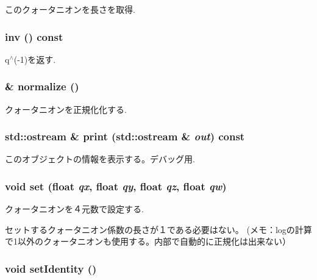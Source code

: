 このクォータニオンを長さを取得. \hypertarget{classm3g_1_1Quaternion_c544c21c80182fc0a7f2c9dbe5f42a0a}{
\subsubsection[{inv}]{ inv () const}}
\label{classm3g_1_1Quaternion_c544c21c80182fc0a7f2c9dbe5f42a0a}


q$^\wedge$(-1)を返す. \hypertarget{classm3g_1_1Quaternion_c9cc178bcc449e08499113c35feb2a2b}{
\subsubsection[{normalize}]{ \& normalize ()}}
\label{classm3g_1_1Quaternion_c9cc178bcc449e08499113c35feb2a2b}


クォータニオンを正規化化する. \hypertarget{classm3g_1_1Quaternion_6fea17fa1532df3794f8cb39cb4f911f}{
\subsubsection[{print}]{\setlength{\rightskip}{0pt plus 5cm}std::ostream \& print (std::ostream \& {\em out}) const}}
\label{classm3g_1_1Quaternion_6fea17fa1532df3794f8cb39cb4f911f}


このオブジェクトの情報を表示する。デバッグ用. \hypertarget{classm3g_1_1Quaternion_0712dc357557a30ac0da0a9d4cdd278c}{
\subsubsection[{set}]{\setlength{\rightskip}{0pt plus 5cm}void set (float {\em qx}, \/  float {\em qy}, \/  float {\em qz}, \/  float {\em qw})}}
\label{classm3g_1_1Quaternion_0712dc357557a30ac0da0a9d4cdd278c}


クォータニオンを４元数で設定する.

セットするクォータニオン係数の長さが１である必要はない。 (メモ：logの計算で1以外のクォータニオンも使用する。内部で自動的に正規化は出来ない） \hypertarget{classm3g_1_1Quaternion_382e6ad7e6721b121e510959e1011be3}{
\subsubsection[{setIdentity}]{\setlength{\rightskip}{0pt plus 5cm}void setIdentity ()}}
\label{classm3g_1_1Quaternion_382e6ad7e6721b121e510959e1011be3}



